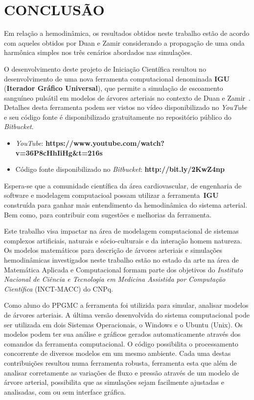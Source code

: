 \documentclass[
        english,			
        brazil			        %
        ,<...>]{abntbibufjf}
\begin{document}
\chapter{CONCLUSÃO}

Em relação a hemodinâmica, os resultados obtidos neste trabalho estão de acordo com aqueles obtidos por Duan e Zamir \cite{Duan} considerando a propagação de uma onda harmônica simples nos três cenários abordados nas simulações.

O desenvolvimento deste projeto de Iniciação Científica resultou no desenvolvimento de uma nova ferramenta computacional denominada \textbf{IGU} (\textbf{Iterador Gráfico Universal}), que permite a simulação de escoamento sanguíneo pulsátil em modelos de árvores arteriais no contexto de Duan e Zamir~\cite{Duan}. Detalhes desta ferramenta podem ser vistos no vídeo disponibilizado no \textit{YouTube} e seu código fonte é disponibilizado gratuitamente no repositório público do \textit{Bitbucket}.
\begin{itemize}
	\item \textit{YouTube}: \textbf{https://www.youtube.com/watch?v=36P8cHhIiHg\&t=216s}
	\item Código fonte disponibilizado no \textit{Bitbucket}: \textbf{http://bit.ly/2KwZ4np}
\end{itemize}

Espera-se que a comunidade científica da área cardiovascular, de engenharia de software e modelagem computacioal possam utilizar a ferramenta~\textbf{IGU} construída para ganhar mais entendimento da hemodinâmica do sistema arterial. Bem como, para contribuir com sugestões e melhorias da ferramenta.

Este trabalho visa impactar na área de modelagem computacional de sistemas complexos artificiais, naturais e sócio-culturais e da interação homem natureza. Os modelos matemáticos para descrição de árvores arteriais e simulações hemodinâmicas investigados neste trabalho estão no estado da arte na área de Matemática Aplicada e Computacional formam parte dos objetivos do \textit{Instituto Nacional de Ciência e Tecnologia em Medicina Assistida por Computação Científica} (INCT-MACC) do CNPq.

Como aluno do PPGMC a ferramenta foi utilizida para simular, analisar modelos de árvores arteriais. A última versão desenvolvida do sistema computacional pode ser utilizada em dois Sistemas Operacionais, o Windows e o Ubuntu (Unix). Os modelos podem ter sua análise e gráficos gerados automaticamente através dos comandos da ferramenta computacional. O código possibilita o processamento concorrente de diversos modelos em um mesmo ambiente. Cada uma destas contribuições resultou numa ferramenta robusta,  ferramenta esta que além de analisar corretamente as variações de fluxo e pressão através de um modelo de árvore arterial, possibilita que as simulações sejam facilmente ajustadas e analisadas, com ou sem interface gráfica.
\end{document}
